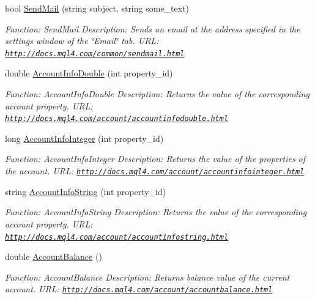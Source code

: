 \begin{DoxyCompactItemize}
bool \hyperlink{class_m_q_l4_c_sharp_1_1_base_1_1_m_q_l_base_a405f8526a4e4f94892a2c0a53d90ee15}{Send\+Mail} (string subject, string some\+\_\+text)
\begin{DoxyCompactList}\small\item\em Function\+: Send\+Mail Description\+: Sends an email at the address specified in the settings window of the \char`\"{}\+Email\char`\"{} tab. U\+RL\+: \href{http://docs.mql4.com/common/sendmail.html}{\tt http\+://docs.\+mql4.\+com/common/sendmail.\+html} \end{DoxyCompactList}\item 
double \hyperlink{class_m_q_l4_c_sharp_1_1_base_1_1_m_q_l_base_a690f79cdf0a2269e25929eda5a5a9ddf}{Account\+Info\+Double} (int property\+\_\+id)
\begin{DoxyCompactList}\small\item\em Function\+: Account\+Info\+Double Description\+: Returns the value of the corresponding account property. U\+RL\+: \href{http://docs.mql4.com/account/accountinfodouble.html}{\tt http\+://docs.\+mql4.\+com/account/accountinfodouble.\+html} \end{DoxyCompactList}\item 
long \hyperlink{class_m_q_l4_c_sharp_1_1_base_1_1_m_q_l_base_a38d507439979416e3badbe4f19cf503e}{Account\+Info\+Integer} (int property\+\_\+id)
\begin{DoxyCompactList}\small\item\em Function\+: Account\+Info\+Integer Description\+: Returns the value of the properties of the account. U\+RL\+: \href{http://docs.mql4.com/account/accountinfointeger.html}{\tt http\+://docs.\+mql4.\+com/account/accountinfointeger.\+html} \end{DoxyCompactList}\item 
string \hyperlink{class_m_q_l4_c_sharp_1_1_base_1_1_m_q_l_base_a6d53fc9734126ee2371d7e71eb97ced7}{Account\+Info\+String} (int property\+\_\+id)
\begin{DoxyCompactList}\small\item\em Function\+: Account\+Info\+String Description\+: Returns the value of the corresponding account property. U\+RL\+: \href{http://docs.mql4.com/account/accountinfostring.html}{\tt http\+://docs.\+mql4.\+com/account/accountinfostring.\+html} \end{DoxyCompactList}\item 
double \hyperlink{class_m_q_l4_c_sharp_1_1_base_1_1_m_q_l_base_a381df1a586aee9ffdc9b9a2e100d50eb}{Account\+Balance} ()
\begin{DoxyCompactList}\small\item\em Function\+: Account\+Balance Description\+: Returns balance value of the current account. U\+RL\+: \href{http://docs.mql4.com/account/accountbalance.html}{\tt http\+://docs.\+mql4.\+com/account/accountbalance.\+html} \end{DoxyCompactList}\item 

\end{DoxyCompactItemize}
